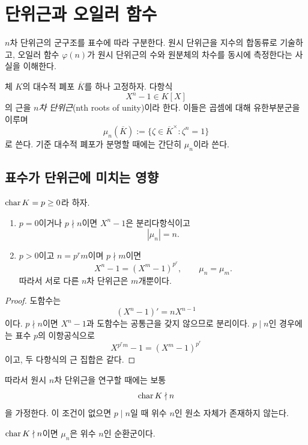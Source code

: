 \clearpage
\section{단위근과 오일러 함수}
\label{sec:roots-unity-totient}

\begin{learninggoal}
$n$차 단위근의 군구조를 표수에 따라 구분한다. 원시 단위근을 지수의 합동류로 기술하고, 오일러 함수 $\varphi(n)$가 원시 단위근의 수와 원분체의 차수를 동시에 측정한다는 사실을 이해한다.
\end{learninggoal}

체 $K$의 대수적 폐포 $\overline K$를 하나 고정하자. 다항식
\[
  X^n-1\in K[X]
\]
의 근을 \emph{$n$차 단위근}(nth roots of unity)이라 한다. 이들은 곱셈에 대해 유한부분군을 이루며
\[
  \mu_n(\overline K)
  :=\{\zeta\in\overline K^\times:\zeta^n=1\}
\]
로 쓴다. 기준 대수적 폐포가 분명할 때에는 간단히 $\mu_n$이라 쓴다.

\subsection{표수가 단위근에 미치는 영향}

\begin{proposition}[서로 다른 단위근의 수]
\label{prop:number-distinct-roots-unity}
$\operatorname{char} K=p\ge0$라 하자.
\begin{enumerate}[label=(\roman*)]
  \item $p=0$이거나 $p\nmid n$이면 $X^n-1$은 분리다항식이고
  \[
    |\mu_n|=n.
  \]
  \item $p>0$이고 $n=p^rm$이며 $p\nmid m$이면
  \[
    X^n-1=(X^m-1)^{p^r},
    \qquad
    \mu_n=\mu_m.
  \]
  따라서 서로 다른 $n$차 단위근은 $m$개뿐이다.
\end{enumerate}
\end{proposition}

\begin{proof}
도함수는
\[
  (X^n-1)'=nX^{n-1}
\]
이다. $p\nmid n$이면 $X^n-1$과 도함수는 공통근을 갖지 않으므로 분리이다. $p\mid n$인 경우에는 표수 $p$의 이항공식으로
\[
  X^{p^rm}-1=(X^m-1)^{p^r}
\]
이고, 두 다항식의 근 집합은 같다.
\end{proof}

따라서 원시 $n$차 단위근을 연구할 때에는 보통
\[
  \operatorname{char} K\nmid n
\]
을 가정한다. 이 조건이 없으면 $p\mid n$일 때 위수 $n$인 원소 자체가 존재하지 않는다.

\begin{theorem}
\label{thm:roots-unity-cyclic}
$\operatorname{char} K\nmid n$이면 $\mu_n$은 위수 $n$인 순환군이다.
\end{theorem}


